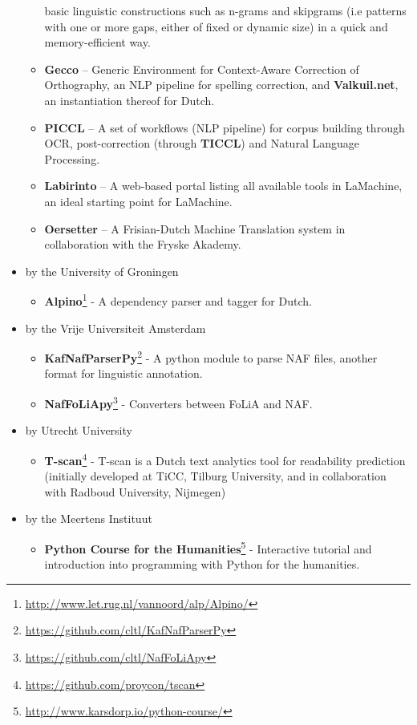 \documentclass[a4paper,11pt]{article}
\begin{document}
\begin{itemize}
\begin{itemize}
         basic linguistic constructions such as n-grams and skipgrams (i.e patterns with one or more gaps, either of
         fixed or dynamic size) in a quick and memory-efficient way.
     \item \textbf{Gecco} -- Generic Environment for Context-Aware Correction of Orthography, an NLP pipeline for
         spelling correction,  and \textbf{Valkuil.net}, an instantiation thereof for Dutch.
     \item \textbf{PICCL} -- A set of workflows (NLP pipeline) for corpus building through OCR, post-correction (through \textbf{TICCL}) and Natural Language Processing.
     \item \textbf{Labirinto} -- A web-based portal listing all
         available tools in LaMachine, an ideal starting point for LaMachine.
     \item \textbf{Oersetter} -- A Frisian-Dutch Machine Translation system in collaboration with the Fryske Akademy.
 \end{itemize}
 \item by the University of Groningen
 \begin{itemize}
     \item \textbf{Alpino}\footnote{\url{http://www.let.rug.nl/vannoord/alp/Alpino/}} - A dependency parser and tagger for Dutch.
 \end{itemize}
 \item by the Vrije Universiteit Amsterdam
 \begin{itemize}
     \item \textbf{KafNafParserPy}\footnote{\url{https://github.com/cltl/KafNafParserPy}} - A python module to parse NAF
         files, another format for linguistic annotation.
     \item \textbf{NafFoLiApy}\footnote{\url{https://github.com/cltl/NafFoLiApy}} - Converters between FoLiA and NAF.
 \end{itemize}
 \item by Utrecht University
 \begin{itemize}
     \item  \textbf{T-scan}\footnote{\url{https://github.com/proycon/tscan}} - T-scan is a Dutch text analytics tool for readability prediction (initially developed at TiCC, Tilburg University, and in collaboration with Radboud University, Nijmegen)
 \end{itemize}
 \item by the Meertens Instituut
 \begin{itemize}
     \item \textbf{Python Course for the Humanities}\footnote{\url{http://www.karsdorp.io/python-course/}} - Interactive
         tutorial and introduction into programming with Python for the humanities.
 \end{itemize}
\end{itemize}
\end{document}
